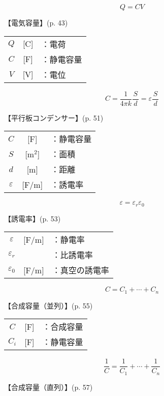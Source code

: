 \documentclass[10pt]{jarticle}
\begin{document}
\newpage
\[
Q = C V
\]


\vskip3mm
【電気容量】{\footnotesize (p. 43)}

\begin{tabular}{ccl}
$Q$	&[C]	&：電荷 \\
$C$	&[F]	&：静電容量 \\
$V$	&[V]	&：電位
\end{tabular}





\newpage
\[
C = \frac{1}{4\pi k} \frac{S}{\, d \,} = \varepsilon \frac{S}{\, d \,}
\]


\vskip3mm
【平行板コンデンサー】{\footnotesize (p. 51)}

\begin{tabular}{ccl}
$C$	&[F]	&：静電容量 \\
$S$	&[m$^2$]	&：面積 \\
$d$	&[m]	&：距離 \\
$\varepsilon$	&[F/m]	&：誘電率
\end{tabular}




\newpage
\[
\varepsilon = \varepsilon_r \varepsilon_0
\]


\vskip3mm
【誘電率】{\footnotesize (p. 53)}

\begin{tabular}{ccl}
$\varepsilon$	&[F/m]	&：静電率 \\
$\varepsilon_r$	&	&：比誘電率\\
$\varepsilon_0$	&[F/m]	&：真空の誘電率
\end{tabular}






\newpage
\[
C = C_1 + \cdots + C_n
\]


\vskip3mm
【合成容量（並列）】{\footnotesize (p. 55)}

\begin{tabular}{ccl}
$C$	&[F]	&：合成容量 \\
$C_i$	&[F]	&：静電容量 \\
\end{tabular}




\newpage
\[
\frac{1}{C} = \frac{1}{C_1} + \cdots + \frac{1}{C_n}
\]


\vskip3mm
【合成容量（直列）】{\footnotesize (p. 57)}
\end{document}
